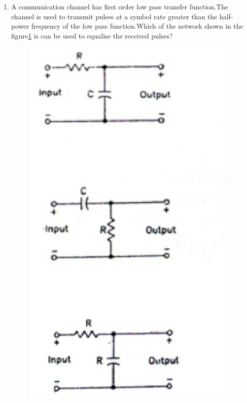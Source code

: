 \documentclass[journal,12pt,twocolumn]{IEEEtran}
\begin{document}
\begin{enumerate}
\item A communication channel has first order low pass transfer function.The channel is used to transmit pulses at a symbol rate greater than the half-power frequency of the low pass function.Which of the network shown in the figure\ref{fig17} is can be used to equalise the received pulses?
\begin{figure}[!h]
\begin{center}
\includegraphics[scale=0.8]{./figs/fig17.eps}
\caption{}
\label{fig17}
\end{center}  
\end{figure}



\end{enumerate}
\end{document}
